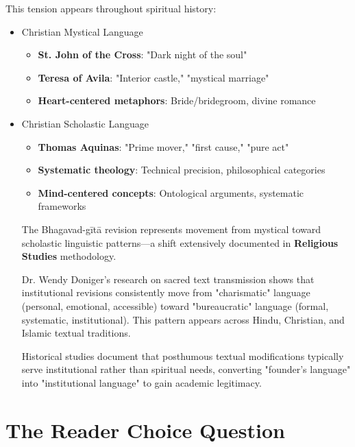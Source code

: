 \documentclass[11pt,twoside]{book}
\begin{document}
This tension appears throughout spiritual history:
\begin{itemize}
\item Christian Mystical Language
\label{sec:org5ab59d8}
\begin{itemize}
\item \textbf{\textbf{St. John of the Cross}}: "Dark night of the soul"
\item \textbf{\textbf{Teresa of Avila}}: "Interior castle," "mystical marriage"
\item \textbf{\textbf{Heart-centered metaphors}}: Bride/bridegroom, divine romance
\end{itemize}
\item Christian Scholastic Language
\label{sec:org720d46f}
\begin{itemize}
\item \textbf{\textbf{Thomas Aquinas}}: "Prime mover," "first cause," "pure act"
\item \textbf{\textbf{Systematic theology}}: Technical precision, philosophical categories
\item \textbf{\textbf{Mind-centered concepts}}: Ontological arguments, systematic frameworks
\end{itemize}

The Bhagavad-gītā revision represents movement from mystical toward scholastic linguistic patterns—a shift extensively documented in \textbf{\textbf{Religious Studies}} methodology.

Dr. Wendy Doniger's research on sacred text transmission shows that institutional revisions consistently move from "charismatic" language (personal, emotional, accessible) toward "bureaucratic" language (formal, systematic, institutional). This pattern appears across Hindu, Christian, and Islamic textual traditions.

Historical studies document that posthumous textual modifications typically serve institutional rather than spiritual needs, converting "founder's language" into "institutional language" to gain academic legitimacy.
\end{itemize}
\section*{The Reader Choice Question}
\label{sec:orgb9126b9}
\end{document}
